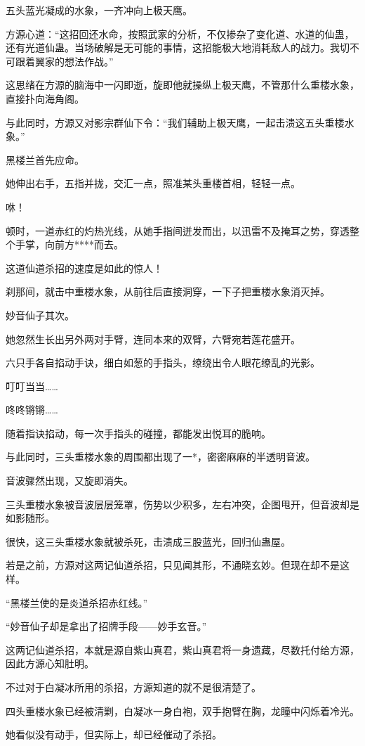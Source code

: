 \begin{this_body}
五头蓝光凝成的水象，一齐冲向上极天鹰。

方源心道：“这招回还水命，按照武家的分析，不仅掺杂了变化道、水道的仙蛊，还有光道仙蛊。当场破解是无可能的事情，这招能极大地消耗敌人的战力。我切不可跟着翼家的想法作战。”

这思绪在方源的脑海中一闪即逝，旋即他就操纵上极天鹰，不管那什么重楼水象，直接扑向海角阁。

与此同时，方源又对影宗群仙下令：“我们辅助上极天鹰，一起击溃这五头重楼水象。”

黑楼兰首先应命。

她伸出右手，五指并拢，交汇一点，照准某头重楼首相，轻轻一点。

咻！

顿时，一道赤红的灼热光线，从她手指间迸发而出，以迅雷不及掩耳之势，穿透整个手掌，向前方****而去。

这道仙道杀招的速度是如此的惊人！

刹那间，就击中重楼水象，从前往后直接洞穿，一下子把重楼水象消灭掉。

妙音仙子其次。

她忽然生长出另外两对手臂，连同本来的双臂，六臂宛若莲花盛开。

六只手各自掐动手诀，细白如葱的手指头，缭绕出令人眼花缭乱的光影。

叮叮当当……

咚咚锵锵……

随着指诀掐动，每一次手指头的碰撞，都能发出悦耳的脆响。

与此同时，三头重楼水象的周围都出现了一*，密密麻麻的半透明音波。

音波骤然出现，又旋即消失。

三头重楼水象被音波层层笼罩，伤势以少积多，左右冲突，企图甩开，但音波却是如影随形。

很快，这三头重楼水象就被杀死，击溃成三股蓝光，回归仙蛊屋。

若是之前，方源对这两记仙道杀招，只见闻其形，不通晓玄妙。但现在却不是这样。

“黑楼兰使的是炎道杀招赤红线。”

“妙音仙子却是拿出了招牌手段——妙手玄音。”

这两记仙道杀招，本就是源自紫山真君，紫山真君将一身遗藏，尽数托付给方源，因此方源心知肚明。

不过对于白凝冰所用的杀招，方源知道的就不是很清楚了。

四头重楼水象已经被清剿，白凝冰一身白袍，双手抱臂在胸，龙瞳中闪烁着冷光。

她看似没有动手，但实际上，却已经催动了杀招。


\end{this_body}
